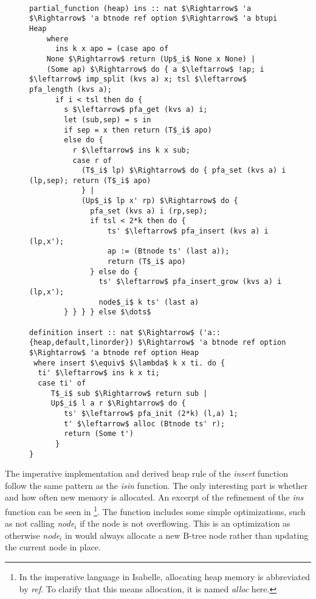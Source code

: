 \begin{figure}
\begin{lstlisting}[mathescape=true, language=Isabelle, label={lst:imp-ins-fun},
    caption={Excerpt of the imperative insert function}]

partial_function (heap) ins :: nat $\Rightarrow$ 'a $\Rightarrow$ 'a btnode ref option $\Rightarrow$ 'a btupi Heap 
    where 
      ins k x apo = (case apo of 
    None $\Rightarrow$ return (Up$_i$ None x None) | 
    (Some ap) $\Rightarrow$ do { a $\leftarrow$ !ap; i $\leftarrow$ imp_split (kvs a) x; tsl $\leftarrow$ pfa_length (kvs a); 
      if i < tsl then do { 
        s $\leftarrow$ pfa_get (kvs a) i; 
        let (sub,sep) = s in 
        if sep = x then return (T$_i$ apo) 
        else do { 
          r $\leftarrow$ ins k x sub; 
          case r of  
            (T$_i$ lp) $\Rightarrow$ do { pfa_set (kvs a) i (lp,sep); return (T$_i$ apo) 
            } | 
            (Up$_i$ lp x' rp) $\Rightarrow$ do { 
              pfa_set (kvs a) i (rp,sep); 
              if tsl < 2*k then do { 
                  ts' $\leftarrow$ pfa_insert (kvs a) i (lp,x'); 
                  ap := (Btnode ts' (last a)); 
                  return (T$_i$ apo) 
              } else do { 
                ts' $\leftarrow$ pfa_insert_grow (kvs a) i (lp,x'); 
                node$_i$ k ts' (last a) 
        } } } } else $\dots$

definition insert :: nat $\Rightarrow$ ('a::{heap,default,linorder}) $\Rightarrow$ 'a btnode ref option $\Rightarrow$ 'a btnode ref option Heap
 where insert $\equiv$ $\lambda$ k x ti. do {
  ti' $\leftarrow$ ins k x ti;
  case ti' of
     T$_i$ sub $\Rightarrow$ return sub |
     Up$_i$ l a r $\Rightarrow$ do {
        ts' $\leftarrow$ pfa_init (2*k) (l,a) 1;
        t' $\leftarrow$ alloc (Btnode ts' r);
        return (Some t')
      }
}

\end{lstlisting}
\end{figure}

The imperative implementation and derived heap rule of the \textit{insert} function follow
the same pattern as the \textit{isin} function.
The only interesting part is whether and how often new memory is allocated.
An excerpt of the refinement of the \textit{ins} function
can be seen in \footnote{
    In the imperative language in Isabelle, allocating heap memory
    is abbreviated by \textit{ref}.
    To clarify that this means allocation, it is named \textit{alloc} here.
}.
The function includes some simple optimizations, such as not calling
\textit{node$_i$} if the node is not overflowing.
This is an optimization as otherwise \textit{node$_i$} in
 would always allocate a new B-tree node
rather than updating the current node in place.

